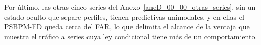 Por último, las otras cinco series del Anexo~\ref{aneD_00_00_otras_series}, sin un estado oculto que separe perfiles, tienen predictivas unimodales, y en ellas el PSBPM-FD queda cerca del FAR, lo que delimita el alcance de la ventaja que muestra el tráfico a series cuya ley condicional tiene más de un comportamiento.